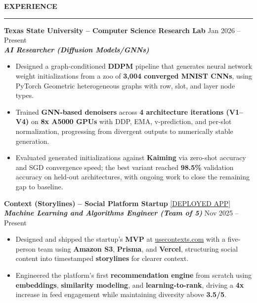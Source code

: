 \documentclass[10pt, letterpaper]{article}
\newenvironment{highlights}{
    \begin{itemize}[
        topsep=0.10 cm,
        parsep=0.10 cm,
        partopsep=0pt,
        itemsep=0pt,
        leftmargin=0 cm + 10pt
    ]
}{
    \end{itemize}
} %
\begin{document}
    {\bfseries EXPERIENCE} \\
    \vspace{2pt}
    \hrule
    \vspace{2pt}
    \textbf{Texas State University -- Computer Science Research Lab} \hfill Jan 2026 -- Present \\
    \textit{\textbf{AI Researcher (Diffusion Models/GNNs)}} \\
    \begin{highlights}
        \item Designed a graph-conditioned \textbf{DDPM} pipeline that generates neural network weight initializations from a zoo of \textbf{3,004 converged MNIST CNNs}, using PyTorch Geometric heterogeneous graphs with row, slot, and layer node types.
        \item Trained \textbf{GNN-based denoisers} across \textbf{4 architecture iterations (V1--V4)} on \textbf{8x A5000 GPUs} with DDP, EMA, v-prediction, and per-slot normalization, progressing from divergent outputs to numerically stable generation.
        \item Evaluated generated initializations against \textbf{Kaiming} via zero-shot accuracy and SGD convergence speed; the best variant reached \textbf{98.5\%} validation accuracy on held-out architectures, with ongoing work to close the remaining gap to baseline.
    \end{highlights}
    \vspace{3pt}
    
    \textbf{Context (Storylines) -- Social Platform Startup} \href{https://usecontexts.com}{[DEPLOYED APP]} \\
    \textit{\textbf{Machine Learning and Algorithms Engineer (Team of 5)}} \hfill Nov 2025 -- Present \\
    \begin{highlights}
        \item Designed and shipped the startup's \textbf{MVP} at \href{https://usecontexts.com}{usecontexts.com} with a five-person team using \textbf{Amazon S3}, \textbf{Prisma}, and \textbf{Vercel}, structuring social content into timestamped \textbf{storylines} for clearer context.
        \item Engineered the platform's first \textbf{recommendation engine} from scratch using \textbf{embeddings}, \textbf{similarity modeling}, and \textbf{learning-to-rank}, driving a \textbf{4x} increase in feed engagement while maintaining diversity above \textbf{3.5/5}.
    \end{highlights}
    \vspace{3pt}
   
\end{document}
